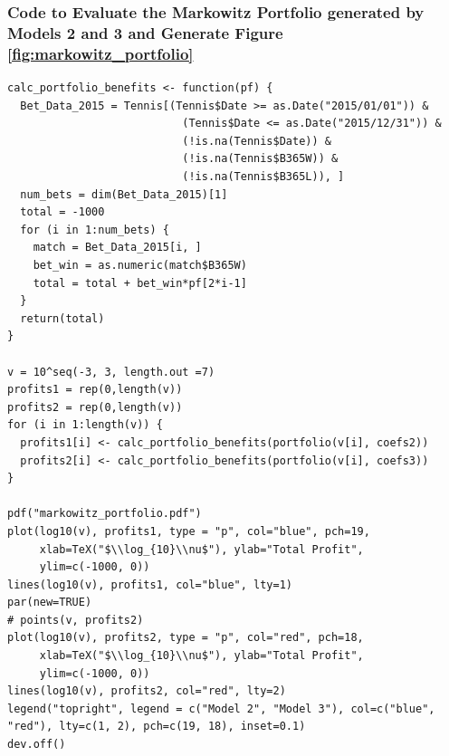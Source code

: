 \documentclass[11pt]{article} %
\begin{document}
\subsubsection*{Code to Evaluate the Markowitz Portfolio generated by Models 2 and 3 and Generate Figure \ref{fig:markowitz_portfolio}}
\begin{lstlisting}
calc_portfolio_benefits <- function(pf) {
  Bet_Data_2015 = Tennis[(Tennis$Date >= as.Date("2015/01/01")) &
                           (Tennis$Date <= as.Date("2015/12/31")) & 
                           (!is.na(Tennis$Date)) & 
                           (!is.na(Tennis$B365W)) & 
                           (!is.na(Tennis$B365L)), ]
  num_bets = dim(Bet_Data_2015)[1]
  total = -1000
  for (i in 1:num_bets) {
    match = Bet_Data_2015[i, ]
    bet_win = as.numeric(match$B365W)
    total = total + bet_win*pf[2*i-1]
  }
  return(total)
}

v = 10^seq(-3, 3, length.out =7)
profits1 = rep(0,length(v))
profits2 = rep(0,length(v))
for (i in 1:length(v)) {
  profits1[i] <- calc_portfolio_benefits(portfolio(v[i], coefs2))
  profits2[i] <- calc_portfolio_benefits(portfolio(v[i], coefs3))
}

pdf("markowitz_portfolio.pdf")
plot(log10(v), profits1, type = "p", col="blue", pch=19,
     xlab=TeX("$\\log_{10}\\nu$"), ylab="Total Profit",
     ylim=c(-1000, 0))
lines(log10(v), profits1, col="blue", lty=1)
par(new=TRUE)
# points(v, profits2)
plot(log10(v), profits2, type = "p", col="red", pch=18,
     xlab=TeX("$\\log_{10}\\nu$"), ylab="Total Profit",
     ylim=c(-1000, 0))
lines(log10(v), profits2, col="red", lty=2)
legend("topright", legend = c("Model 2", "Model 3"), col=c("blue", "red"), lty=c(1, 2), pch=c(19, 18), inset=0.1)
dev.off()
\end{lstlisting}
\end{document}

